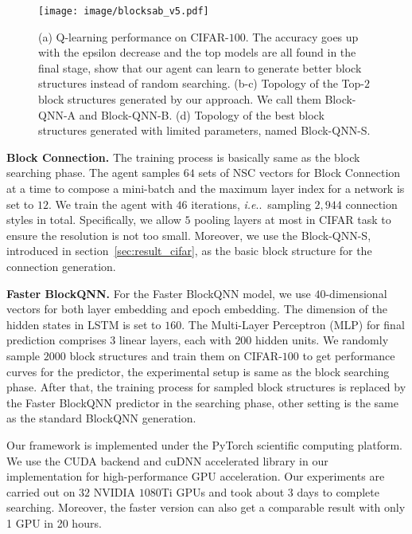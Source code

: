 \documentclass[10pt,journal,compsoc]{IEEEtran}
\makeatletter
\DeclareRobustCommand\onedot{\futurelet\@let@token\@onedot}
\def\@onedot{\ifx\@let@token.\else.\null\fi\xspace}
\def\ie{\emph{i.e}\onedot} \def\Ie{\emph{I.e}\onedot}
\makeatother
\begin{document}
\begin{figure*}[tbp]
	\centering
	\texttt{[image: image/blocksab\_v5.pdf]}
	\caption{(a) Q-learning performance on CIFAR-$100$. The accuracy goes up with the epsilon decrease and the top models are all found in the final stage, show that our agent can learn to generate better block structures instead of random searching. (b-c) Topology of the Top-$2$ block structures generated by our approach. We call them Block-QNN-A and Block-QNN-B. (d) Topology of the best block structures generated with limited parameters, named Block-QNN-S.  }
	\label{fig:8}
\end{figure*}

\vspace{0.1cm}\noindent \textbf{Block Connection.} 
The training process is basically same as the block searching phase. The agent samples $64$ sets of NSC vectors for Block Connection at a time to compose a mini-batch and the maximum layer index for a network is set to $12$. We train the agent with $46$ iterations, \ie~sampling $2,944$ connection styles in total. Specifically, we allow $5$ pooling layers at most in CIFAR task to ensure the resolution is not too small. Moreover, we use the Block-QNN-S, introduced in section~\ref{sec:result_cifar}, as the basic block structure for the connection generation.

\vspace{0.1cm}\noindent \textbf{Faster BlockQNN.} 
For the Faster BlockQNN model, we use $40$-dimensional vectors for both layer embedding and epoch embedding. The dimension of the hidden states in LSTM is set to $160$. The Multi-Layer Perceptron (MLP) for final prediction comprises $3$ linear layers, each with $200$ hidden units. We randomly sample $2000$ block structures and train them on CIFAR-$100$ to get performance curves for the predictor, the experimental setup is same as the block searching phase. After that, the training process for sampled block structures is replaced by the Faster BlockQNN predictor in the searching phase, other setting is the same as the standard BlockQNN generation. 




Our framework is implemented under the PyTorch scientific computing platform. We use the CUDA backend and cuDNN accelerated library in our implementation for high-performance GPU acceleration. Our experiments are carried out on $32$ NVIDIA $1080$Ti GPUs and took about $3$ days to complete searching.
Moreover, the faster version can also get a comparable result with only 1 GPU in 20 hours.
\end{document}
